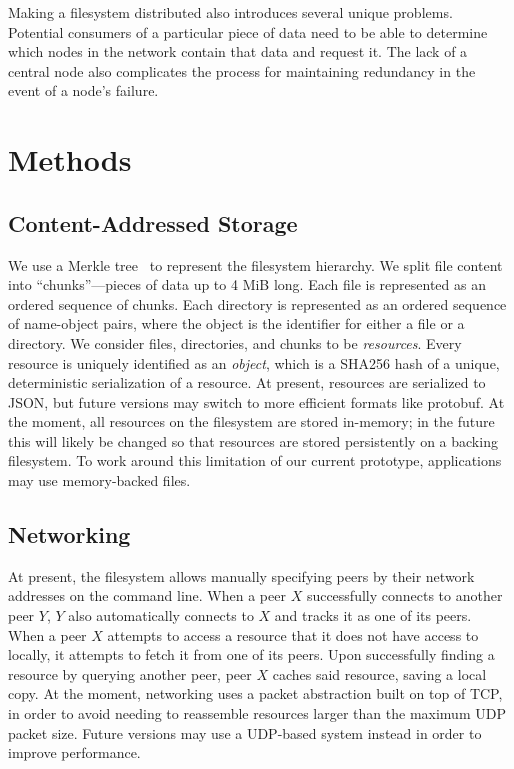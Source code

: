 \documentclass[twocolumn]{article}
\begin{document}
Making a filesystem distributed also introduces several unique problems.
Potential consumers of a particular piece of data need to be able to determine which nodes in the network contain that data and request it.
The lack of a central node also complicates the process for maintaining redundancy in the event of a node's failure.

\section{Methods}

\subsection{Content-Addressed Storage}\label{sec:cas}

We use a Merkle tree~\cite{merkle-1982} to represent the filesystem hierarchy.
We split file content into ``chunks''—pieces of data up to 4 MiB long.
Each file is represented as an ordered sequence of chunks.
Each directory is represented as an ordered sequence of name-object pairs, where the object is the identifier for either a file or a directory.
We consider files, directories, and chunks to be \textit{resources}.
Every resource is uniquely identified as an \textit{object}, which is a SHA256 hash of a unique, deterministic serialization of a resource.
At present, resources are serialized to JSON, but future versions may switch to more efficient formats like protobuf.
At the moment, all resources on the filesystem are stored in-memory; in the future this will likely be changed so that resources are stored persistently on a backing filesystem.
To work around this limitation of our current prototype, applications may use memory-backed files.

\subsection{Networking}

At present, the filesystem allows manually specifying peers by their network addresses on the command line.
When a peer $X$ successfully connects to another peer $Y$, $Y$ also automatically connects to $X$ and tracks it as one of its peers.
When a peer $X$ attempts to access a resource that it does not have access to locally, it attempts to fetch it from one of its peers.
Upon successfully finding a resource by querying another peer, peer $X$ caches said resource, saving a local copy.
At the moment, networking uses a packet abstraction built on top of TCP, in order to avoid needing to reassemble resources larger than the maximum UDP packet size.
Future versions may use a UDP-based system instead in order to improve performance.
\end{document}
